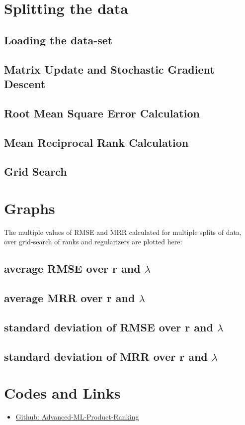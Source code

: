 \documentclass[10pt,conference,letterpaper]{IEEEtran}
\begin{document}
\section{Splitting the data}
\subsection{Loading the data-set}
\subsection{Matrix Update and Stochastic Gradient Descent}
\subsection{Root Mean Square Error Calculation}
\subsection{Mean Reciprocal Rank Calculation}
\subsection{Grid Search}

\section{Graphs}
The multiple values of RMSE and MRR calculated for multiple splits of data, over grid-search of ranks and regularizers are plotted here:

\subsection{average RMSE over r and $\lambda$}
\subsection{average MRR over r and $\lambda$}
\subsection{standard deviation of RMSE over r and $\lambda$}
\subsection{standard deviation of MRR over r and $\lambda$}

\section{Codes and Links}
\begin{itemize}
    \item \href{https://github.com/vishalanand/Advanced-ML-Product-Ranking}{Github: Advanced-ML-Product-Ranking}
\end{itemize}
\end{document}
